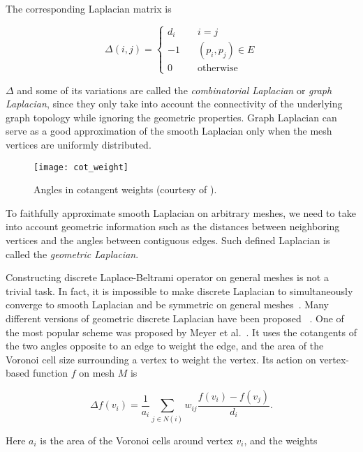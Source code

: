 The corresponding Laplacian matrix is

\begin{equation}
\Delta(i,j)=\left\{
    \begin{array}{lc}
    d_i\quad & i=j \\
    -1\quad & (p_i,p_j)\in E \\
    0\quad & \text{otherwise}
    \end{array}
\right.
\end{equation}

$\Delta$ and some of its variations are called the \emph{combinatorial Laplacian}
or \emph{graph Laplacian}, since they only take into account the connectivity
of the underlying graph topology while ignoring the geometric properties.
Graph Laplacian can serve as a good approximation of the smooth Laplacian only
when the mesh vertices are uniformly distributed.

\begin{figure}
  \centering
  \texttt{[image: cot\_weight]}
  \caption[Angles in cotangent weights]{Angles in cotangent weights (courtesy of \cite{Sorkine:EG:2005}).}
\label{fig:cotweights}
\end{figure}

To faithfully approximate smooth Laplacian on arbitrary meshes, we need to take
into account geometric information such as the distances between neighboring
vertices and the angles between contiguous edges. Such defined Laplacian is
called the \emph{geometric Laplacian}.

Constructing discrete Laplace-Beltrami operator on general meshes is not a trivial task.
In fact, it is impossible to make discrete Laplacian to simultaneously converge to smooth
Laplacian and be symmetric on general meshes~\cite{Rustamov:2007:LEF}. Many different
versions of geometric discrete Laplacian have been proposed
~\cite{pinkall1993computing, Desbrun1999, Xu:2004:GMP, Levy2006, Vallet2008, Belkin:2008:SCG}.
One of the most popular scheme was proposed by Meyer et al.~\cite{Meyer2003}.
It uses the cotangents of the two angles opposite to an edge to weight the edge,
and the area of the Voronoi cell size surrounding a vertex to weight the vertex.
Its action on vertex-based function $f$ on mesh $M$ is

\begin{equation}
\Delta f(v_i)=\frac{1}{a_i}\sum_{j\in N(i)}w_{ij}\frac{f(v_i)-f(v_j)}{d_i}.
\end{equation}

Here $a_i$ is the area of the Voronoi cells around vertex $v_i$, and the weights

